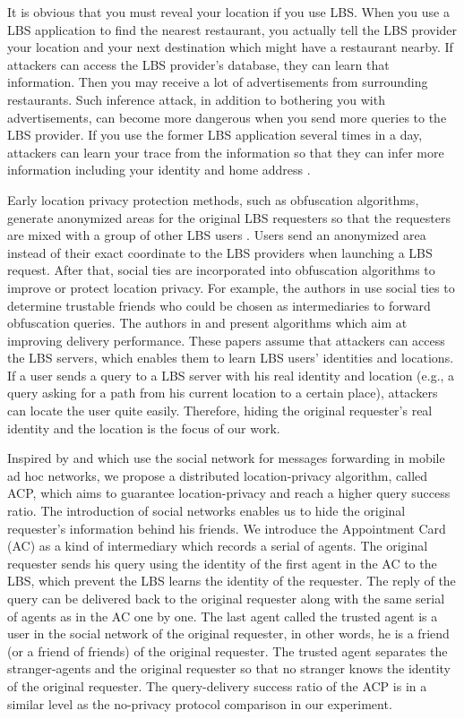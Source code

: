 \documentclass[conference]{IEEEtran}
\begin{document}
It is obvious that you must reveal your location if you use LBS. When you use a LBS application to find the nearest restaurant, you actually tell the LBS provider your location and your next destination which might have a restaurant nearby. If attackers can access the LBS provider's database, they can learn that information. Then you may receive a lot of advertisements from surrounding restaurants. Such inference attack, in addition to bothering you with advertisements, can become more dangerous when you send more queries to the LBS provider. If you use the former LBS application several times in a day, attackers can learn your trace from the information so that they can infer more information including your identity and home address \cite {C23}.

Early location privacy protection methods, such as obfuscation algorithms, generate anonymized areas for the original LBS requesters so that the requesters are mixed with a group of other LBS users \cite{C3} \cite{C21}. Users send an anonymized area instead of their exact coordinate to the LBS providers when launching a LBS request. After that, social ties are incorporated into obfuscation algorithms to improve or protect location privacy. For example, the authors in \cite{C4} use social ties to determine trustable friends who could be chosen as intermediaries to forward obfuscation queries. The authors in \cite{C5} and \cite{C6} present algorithms which aim at improving delivery performance. These papers assume that attackers can access the LBS servers, which enables them to learn LBS users’ identities and locations. If a user sends a query to a LBS server with his real identity and location (e.g., a query asking for a path from his current location to a certain place), attackers can locate the user quite easily. Therefore, hiding the original requester’s real identity and the location is the focus of our work.

Inspired by \cite{5} and \cite{C7} which use the social network for messages forwarding in mobile ad hoc networks, we propose a distributed location-privacy algorithm, called ACP, which aims to guarantee location-privacy and reach a higher query success ratio. The introduction of social networks enables us to hide the original requester's information behind his friends. We introduce the Appointment Card (AC) as a kind of intermediary which records a serial of agents. The original requester sends his query using the identity of the first agent in the AC to the LBS, which prevent the LBS learns the identity of the requester. The reply of the query can be delivered back to the original requester along with the same serial of agents as in the AC one by one. The last agent called the trusted agent is a user in the social network of the original requester, in other words, he is a friend (or a friend of friends) of the original requester. The trusted agent separates the stranger-agents and the original requester so that no stranger knows the identity of the original requester. The query-delivery success ratio of the ACP is in a similar level as the no-privacy protocol comparison in our experiment.
\end{document}
